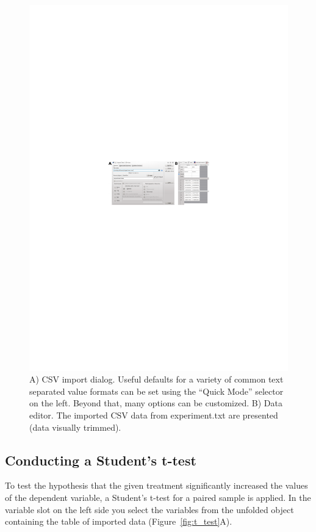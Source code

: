 \begin{figure}[htp]
 \centering
 \includegraphics[clip=true,trim=0cm 5.7cm 0cm 5.7cm,width=16cm]{../figures/import_data.pdf}
 \caption{A) CSV import dialog. Useful defaults for a variety of common text separated value formats can
  be set using the ``Quick Mode'' selector on the left. Beyond that, many options can be customized. B) Data editor. The imported CSV
  data from experiment.txt are presented (data visually trimmed).}
 \label{fig:import_data}
\end{figure}

\subsection{Conducting a Student's t-test}
\label{sec:conducting_ttest}
To test the hypothesis that the given treatment significantly increased
the values of the dependent variable, a Student's
t-test for a paired sample is applied. In the variable slot on the left
side you select the variables from the unfolded
 object containing the table of imported data (Figure~\ref{fig:t_test}A).

